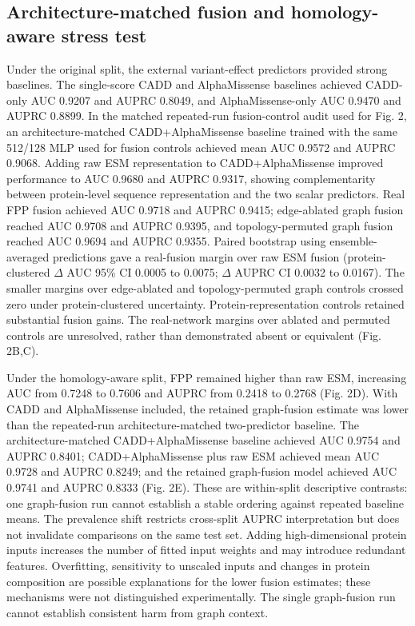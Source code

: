 \documentclass[conference]{IEEEtran}
\newcommand{\CADDAM}{CADD\allowbreak{}+\allowbreak{}AlphaMissense}
\begin{document}
\subsection{Architecture-matched fusion and homology-aware stress test}

Under the original split, the external variant-effect predictors provided strong baselines. The single-score CADD and AlphaMissense baselines achieved CADD-only AUC 0.9207 and AUPRC 0.8049, and AlphaMissense-only AUC 0.9470 and AUPRC 0.8899. In the matched repeated-run fusion-control audit used for Fig. 2, an architecture-matched \CADDAM{} baseline trained with the same 512/128 MLP used for fusion controls achieved mean AUC 0.9572 and AUPRC 0.9068. Adding raw ESM representation to \CADDAM{} improved performance to AUC 0.9680 and AUPRC 0.9317, showing complementarity between protein-level sequence representation and the two scalar predictors. Real FPP fusion achieved AUC 0.9718 and AUPRC 0.9415; edge-ablated graph fusion reached AUC 0.9708 and AUPRC 0.9395, and topology-permuted graph fusion reached AUC 0.9694 and AUPRC 0.9355. Paired bootstrap using ensemble-averaged predictions gave a real-fusion margin over raw ESM fusion (protein-clustered $\Delta$ AUC 95\% CI 0.0005 to 0.0075; $\Delta$ AUPRC CI 0.0032 to 0.0167). The smaller margins over edge-ablated and topology-permuted graph controls crossed zero under protein-clustered uncertainty. Protein-representation controls retained substantial fusion gains. The real-network margins over ablated and permuted controls are unresolved, rather than demonstrated absent or equivalent (Fig. 2B,C).

Under the homology-aware split, FPP remained higher than raw ESM, increasing AUC from 0.7248 to 0.7606 and AUPRC from 0.2418 to 0.2768 (Fig. 2D). With CADD and AlphaMissense included, the retained graph-fusion estimate was lower than the repeated-run architecture-matched two-predictor baseline. The architecture-matched \CADDAM{} baseline achieved AUC 0.9754 and AUPRC 0.8401; \CADDAM{} plus raw ESM achieved mean AUC 0.9728 and AUPRC 0.8249; and the retained graph-fusion model achieved AUC 0.9741 and AUPRC 0.8333 (Fig. 2E). These are within-split descriptive contrasts: one graph-fusion run cannot establish a stable ordering against repeated baseline means. The prevalence shift restricts cross-split AUPRC interpretation but does not invalidate comparisons on the same test set. Adding high-dimensional protein inputs increases the number of fitted input weights and may introduce redundant features. Overfitting, sensitivity to unscaled inputs and changes in protein composition are possible explanations for the lower fusion estimates; these mechanisms were not distinguished experimentally. The single graph-fusion run cannot establish consistent harm from graph context.
\end{document}
